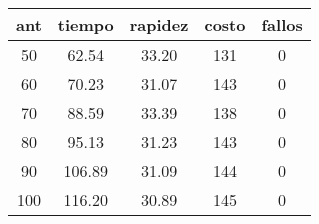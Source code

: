 \begin{table}[h!]
\centering
\begin{tabular}{ccccc}
ant & tiempo & rapidez & costo & fallos \\ 
\hline 
50 & 62.54 & 33.20 & 131 & 0 \\ 
60 & 70.23 & 31.07 & 143 & 0 \\ 
70 & 88.59 & 33.39 & 138 & 0 \\ 
80 & 95.13 & 31.23 & 143 & 0 \\ 
90 & 106.89 & 31.09 & 144 & 0 \\ 
100 & 116.20 & 30.89 & 145 & 0 \\ 
\hline 
\end{tabular}
\end{table}
